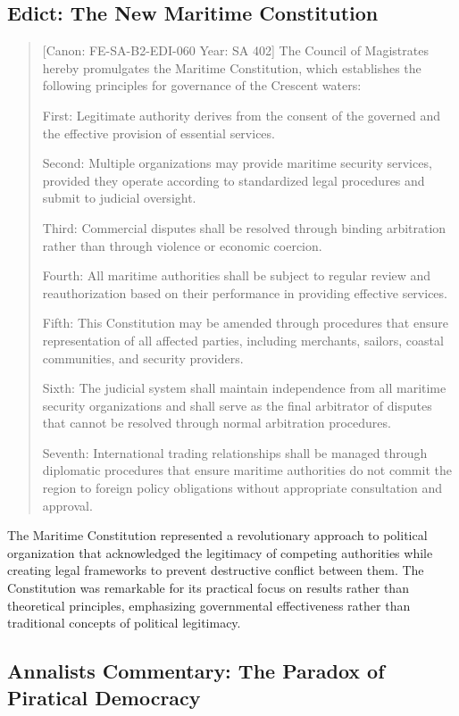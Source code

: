 \subsection{Edict: The New Maritime
Constitution}\label{edict-the-new-maritime-constitution}

\begin{quote}
{[}Canon: FE-SA-B2-EDI-060 \textbar{} Year: SA 402{]} The Council of
Magistrates hereby promulgates the Maritime Constitution, which
establishes the following principles for governance of the Crescent
waters:

First: Legitimate authority derives from the consent of the governed and
the effective provision of essential services.

Second: Multiple organizations may provide maritime security services,
provided they operate according to standardized legal procedures and
submit to judicial oversight.

Third: Commercial disputes shall be resolved through binding arbitration
rather than through violence or economic coercion.

Fourth: All maritime authorities shall be subject to regular review and
reauthorization based on their performance in providing effective
services.

Fifth: This Constitution may be amended through procedures that ensure
representation of all affected parties, including merchants, sailors,
coastal communities, and security providers.

Sixth: The judicial system shall maintain independence from all maritime
security organizations and shall serve as the final arbitrator of
disputes that cannot be resolved through normal arbitration procedures.

Seventh: International trading relationships shall be managed through
diplomatic procedures that ensure maritime authorities do not commit the
region to foreign policy obligations without appropriate consultation
and approval.
\end{quote}

The Maritime Constitution represented a revolutionary approach to
political organization that acknowledged the legitimacy of competing
authorities while creating legal frameworks to prevent destructive
conflict between them. The Constitution was remarkable for its practical
focus on results rather than theoretical principles, emphasizing
governmental effectiveness rather than traditional concepts of political
legitimacy.

\subsection{Annalist\textquotesingle s Commentary: The Paradox of
Piratical
Democracy}\label{annalists-commentary-the-paradox-of-piratical-democracy}

